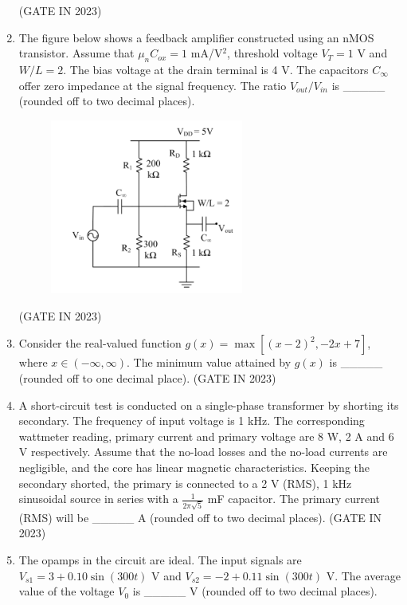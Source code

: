 \documentclass[journal]{IEEEtran}
\begin{document}
\begin{enumerate}
\begin{figure}[H]
      \caption{}
    \label{fig:fig27} 
\end{figure}
\hfill(GATE IN 2023)
    \item The figure below shows a feedback amplifier constructed using an nMOS transistor. Assume that $\mu_n C_{ox} = 1$ mA/V$^2$, threshold voltage $V_T = 1$ V and $W/L = 2$. The bias voltage at the drain terminal is 4 V. The capacitors $C_{\infty}$ offer zero impedance at the signal frequency. The ratio $V_{out}/V_{in}$ is \_\_\_\_\_ (rounded off to two decimal places).
    \begin{figure}[H]
    \centering
      \includegraphics[width=0.6\textwidth]{28.png} 
      \caption{}
    \label{fig:fig28} 
\end{figure}
\hfill(GATE IN 2023)
    \item Consider the real-valued function $g(x) = \max[(x-2)^2, -2x + 7]$, where $x \in (-\infty, \infty)$. The minimum value attained by $g(x)$ is \_\_\_\_\_ (rounded off to one decimal place).
\hfill(GATE IN 2023)
    \item A short-circuit test is conducted on a single-phase transformer by shorting its secondary. The frequency of input voltage is 1 kHz. The corresponding wattmeter reading, primary current and primary voltage are 8 W, 2 A and 6 V respectively. Assume that the no-load losses and the no-load currents are negligible, and the core has linear magnetic characteristics. Keeping the secondary shorted, the primary is connected to a 2 V (RMS), 1 kHz sinusoidal source in series with a $\frac{1}{2\pi\sqrt{5}}$ mF capacitor. The primary current (RMS) will be \_\_\_\_\_ A (rounded off to two decimal places).
\hfill(GATE IN 2023)
    \item The opamps in the circuit are ideal. The input signals are $V_{s1} = 3 + 0.10 \sin(300t)$ V and $V_{s2} = -2 + 0.11 \sin(300t)$ V. The average value of the voltage $V_0$ is \_\_\_\_\_ V (rounded off to two decimal places).

\end{enumerate}
\end{document}
